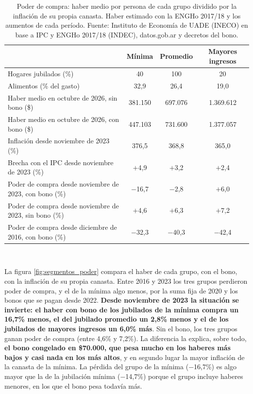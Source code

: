 \documentclass[10pt,a4paper]{article}
\begin{document}
\begin{table}[H]
\centering
\renewcommand{\arraystretch}{1.15}
\caption{Los tres tipos de jubilados}
\label{tab:segmentos}
\begin{tabular}{@{}l c c c@{}}
\toprule
 & \textbf{Mínima} & \textbf{Promedio} & \textbf{Mayores ingresos} \\
\midrule
Hogares jubilados (\%)                               & 40      & 100     & 20 \\
Alimentos (\% del gasto)                             & 32,9    & 26,4    & 19,0 \\
Haber medio en octubre de 2026, sin bono (\$)        & 381.150 & 697.076 & 1.369.612 \\
Haber medio en octubre de 2026, con bono (\$)        & 447.103 & 731.600 & 1.377.057 \\
\midrule
Inflación desde noviembre de 2023 (\%)               & 376,5   & 368,8   & 365,0 \\
Brecha con el IPC desde noviembre de 2023 (\%)       & $+$4,9  & $+$3,2  & $+$2,4 \\
\midrule
Poder de compra desde noviembre de 2023, con bono (\%) & $-$16,7 & $-$2,8 & $+$6,0 \\
Poder de compra desde noviembre de 2023, sin bono (\%) & $+$4,6  & $+$6,3 & $+$7,2 \\
Poder de compra desde diciembre de 2016, con bono (\%) & $-$32,3 & $-$40,3 & $-$42,4 \\
\bottomrule
\end{tabular}\\[0.2cm]
\caption*{Poder de compra: haber medio por persona de cada grupo dividido por la inflación de su propia canasta. Haber estimado con la ENGHo 2017/18 y los aumentos de cada período. Fuente: Instituto de Economía de UADE (INECO) en base a IPC y ENGHo 2017/18 (INDEC), datos.gob.ar y decretos del bono.}
\end{table}

La figura \ref{fig:segmentos_poder} compara el haber de cada grupo, con el bono, con la inflación de su propia canasta. Entre 2016 y 2023 los tres grupos perdieron poder de compra, y el de la mínima algo menos, por la suma fija de 2020 y los bonos que se pagan desde 2022. \textbf{Desde noviembre de 2023 la situación se invierte: el haber con bono de los jubilados de la mínima compra un 16,7\% menos, el del jubilado promedio un 2,8\% menos y el de los jubilados de mayores ingresos un 6,0\% más}. Sin el bono, los tres grupos ganan poder de compra (entre 4,6\% y 7,2\%). La diferencia la explica, sobre todo, \textbf{el bono congelado en \$70.000, que pesa mucho en los haberes más bajos y casi nada en los más altos}, y en segundo lugar la mayor inflación de la canasta de la mínima. La pérdida del grupo de la mínima ($-$16,7\%) es algo mayor que la de la jubilación mínima ($-$14,7\%) porque el grupo incluye haberes menores, en los que el bono pesa todavía más.
\end{document}
